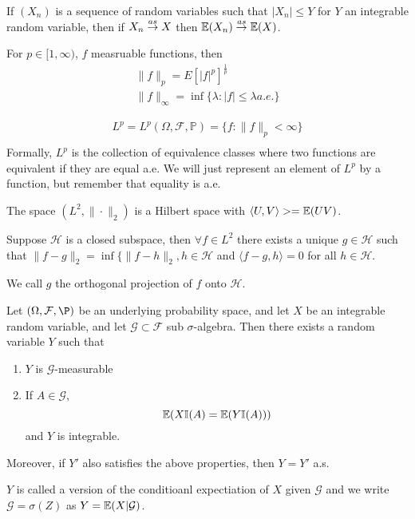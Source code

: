 \begin{thm}
  If $(X_{n})$ is a sequence of random variables such that $|X_{n}|
  \leq Y$ for $Y$ an integrable random variable, then if $X_{n} \overset{as}{\rightarrow}
  X$ then $\E{X_{n}} \cas \E{X}$. 
\end{thm}

\begin{defn}
  \label{defn:9}
  For $p \in [1, \infty)$, $f$ measruable functions, then
  \begin{align}
    \| f \|_{p} = E[|f|^{p}]^{\frac{1}{p}} \\
    \| f \|_{\infty} = \inf \{ \lambda : |f| \leq \lambda a.e. \}
  \end{align}
\end{defn}

\begin{defn}
  \label{defn:10}
  \begin{align*}
    L^{p} = L^{p}(\Omega, \mathcal{F}, \mathbb{P}) = \{ f : \| f
    \|_{p} < \infty \} \\
  \end{align*}
  Formally, $L^{p}$ is the collection of equivalence classes where two
  functions are equivalent if they are equal a.e.  We will just
  represent an element of $L^{p}$ by a function, but remember that
  equality is a.e.
\end{defn}

\begin{thm}
  The space $(L^{2}, \| \cdot \|_{2})$ is a Hilbert space with
  $\langle U, V \rangle> = \E{UV}$.

  Suppose $\mathcal{H}$ is a closed subspace, then $\forall f \in
  L^{2}$ there exists a unique $g \in \mathcal{H}$ such that $\| f - g
  \|_{2} = \inf \{ \| f- h \|_{2}, h \in \mathcal{H}$ and $\langle f
  -g, h \rangle = 0$ for all $h \in \mathcal{H}$.

  We call $g$ the orthogonal projection of $f$ onto $\mathcal{H}$.
\end{thm}


\begin{thm}
  Let $(\Omega, \mathcal{F}, \P)$ be an underlying probability space,
  and let $X$ be an integrable random variable, and let $\mathcal{G}
  \subset \mathcal{F}$ sub $\sigma$-algebra.  Then there exists a
  random variable $Y$ such that
  \begin{enumerate}
  \item $Y$ is $\mathcal{G}$-measurable
  \item If $A \in \mathcal{G}$,
    \begin{equation}
      \label{exmp:general:1}
      \E{X \I{A} = \E{Y \I{A}}}
    \end{equation} and $Y$ is integrable.
  \end{enumerate}
  Moreover, if $Y'$ also satisfies the above properties, then $Y = Y'$ a.s.
\end{thm}
\begin{remark}
  $Y$ is called a version of the conditioanl expectiation of $X$ given
  $\mathcal{G}$ and we write $\mathcal{G} = \sigma(Z)$ as $Y = \E{X |
    \mathcal{G}}$.
\end{remark}


